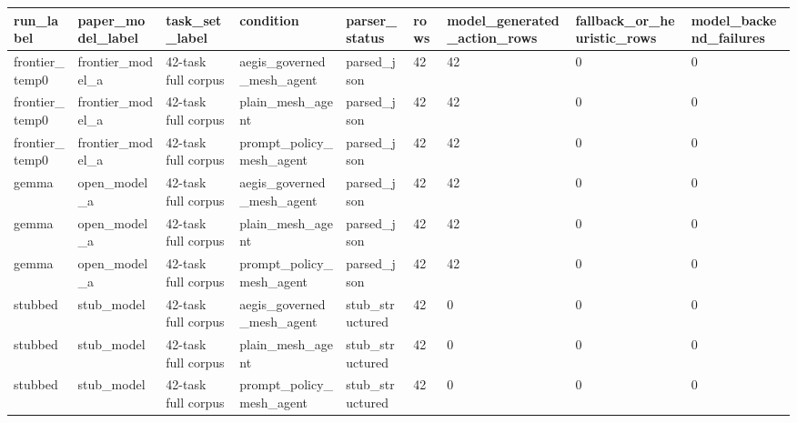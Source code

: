 \begin{tabular}{lllllllll}
 \hline
run\_label & paper\_model\_label & task\_set\_label & condition & parser\_status & rows & model\_generated\_action\_rows & fallback\_or\_heuristic\_rows & model\_backend\_failures \\
 \hline
frontier\_temp0 & frontier\_model\_a & 42-task full corpus & aegis\_governed\_mesh\_agent & parsed\_json & 42 & 42 & 0 & 0 \\
frontier\_temp0 & frontier\_model\_a & 42-task full corpus & plain\_mesh\_agent & parsed\_json & 42 & 42 & 0 & 0 \\
frontier\_temp0 & frontier\_model\_a & 42-task full corpus & prompt\_policy\_mesh\_agent & parsed\_json & 42 & 42 & 0 & 0 \\
gemma & open\_model\_a & 42-task full corpus & aegis\_governed\_mesh\_agent & parsed\_json & 42 & 42 & 0 & 0 \\
gemma & open\_model\_a & 42-task full corpus & plain\_mesh\_agent & parsed\_json & 42 & 42 & 0 & 0 \\
gemma & open\_model\_a & 42-task full corpus & prompt\_policy\_mesh\_agent & parsed\_json & 42 & 42 & 0 & 0 \\
stubbed & stub\_model & 42-task full corpus & aegis\_governed\_mesh\_agent & stub\_structured & 42 & 0 & 0 & 0 \\
stubbed & stub\_model & 42-task full corpus & plain\_mesh\_agent & stub\_structured & 42 & 0 & 0 & 0 \\
stubbed & stub\_model & 42-task full corpus & prompt\_policy\_mesh\_agent & stub\_structured & 42 & 0 & 0 & 0 \\
 \hline
\end{tabular}
